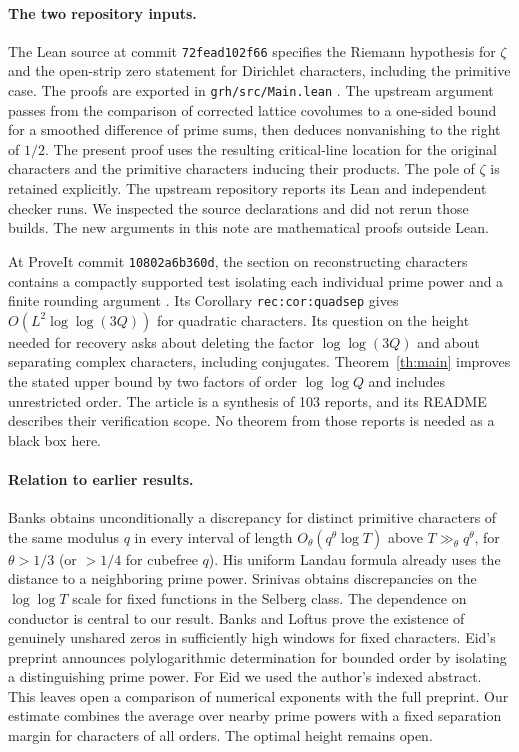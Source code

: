 \documentclass[11pt,letterpaper]{article}
\begin{document}
\paragraph{The two repository inputs.}
The Lean source at commit \texttt{72fead102f66} specifies the Riemann hypothesis for $\zeta$ and the open-strip zero statement for Dirichlet characters, including the primitive case. The proofs are exported in \texttt{grh/src/Main.lean} \cite{lean}. The upstream argument passes from the comparison of corrected lattice covolumes to a one-sided bound for a smoothed difference of prime sums, then deduces nonvanishing to the right of $1/2$. The present proof uses the resulting critical-line location for the original characters and the primitive characters inducing their products. The pole of $\zeta$ is retained explicitly. The upstream repository reports its Lean and independent checker runs. We inspected the source declarations and did not rerun those builds. The new arguments in this note are mathematical proofs outside Lean.

At ProveIt commit \texttt{10802a6b360d}, the section on reconstructing characters contains a compactly supported test isolating each individual prime power and a finite rounding argument \cite{article}. Its Corollary \texttt{rec:cor:quadsep} gives $O(L^2\log\log(3Q))$ for quadratic characters. Its question on the height needed for recovery asks about deleting the factor $\log\log(3Q)$ and about separating complex characters, including conjugates. Theorem~\ref{th:main} improves the stated upper bound by two factors of order $\log\log Q$ and includes unrestricted order. The article is a synthesis of 103 reports, and its README describes their verification scope. No theorem from those reports is needed as a black box here.

\paragraph{Relation to earlier results.}
Banks \cite{banks} obtains unconditionally a discrepancy for distinct primitive characters of the same modulus $q$ in every interval of length $O_\theta(q^\theta\log T)$ above $T\gg_\theta q^\theta$, for $\theta>1/3$ (or $>1/4$ for cubefree $q$). His uniform Landau formula already uses the distance to a neighboring prime power. Srinivas \cite{srinivas} obtains discrepancies on the $\log\log T$ scale for fixed functions in the Selberg class. The dependence on conductor is central to our result. Banks and Loftus \cite{banksloftus} prove the existence of genuinely unshared zeros in sufficiently high windows for fixed characters. Eid's preprint \cite{eid} announces polylogarithmic determination for bounded order by isolating a distinguishing prime power. For Eid we used the author's indexed abstract. This leaves open a comparison of numerical exponents with the full preprint. Our estimate combines the average over nearby prime powers with a fixed separation margin for characters of all orders. The optimal height remains open.
\end{document}
